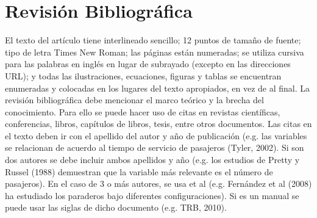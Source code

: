 \section{Revisión Bibliográfica}
\label{sec:2}

El texto del artículo tiene interlineado sencillo; 12 puntos de tamaño de fuente; tipo de letra Times New Roman; las páginas están numeradas; se utiliza cursiva para las palabras en inglés en lugar de subrayado (excepto en las direcciones URL); y todas las ilustraciones, ecuaciones, figuras y tablas se encuentran enumeradas y colocadas en los lugares del texto apropiados, en vez de al final.
La revisión bibliográfica debe mencionar el marco teórico y la brecha del conocimiento. Para ello se puede hacer uso de citas en revistas científicas, conferencias, libros, capítulos de libros, tesis, entre otros documentos. 
Las citas en el texto deben ir con el apellido del autor y año de publicación (e.g. las variables se relacionan de acuerdo al tiempo de servicio de pasajeros (Tyler, 2002). 
Si son dos autores se debe incluir ambos apellidos y año (e.g. los estudios de Pretty y Russel (1988) demuestran que la variable más relevante es el número de pasajeros). 
En el caso de 3 o más autores, se usa et al (e.g. Fernández et al (2008) ha estudiado los paraderos bajo diferentes configuraciones).
Si es un manual se puede usar las siglas de dicho documento (e.g. TRB, 2010). 
